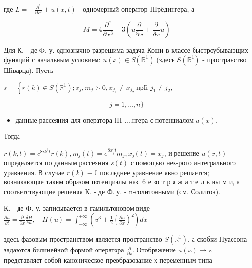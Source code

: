 \documentclass[10pt]{article}
\begin{document}
где $L=-\frac{\partial^{2}}{\partial x^{2}}+u(x, t)$ - одномерный оператор IIIрёдингера, а



\[

M=4 \frac{\partial^{s}}{\partial x^{3}}-3\left(u \frac{\partial}{\partial x}+\frac{\partial}{\partial x} u\right)

\]



Для К. - де Ф. у. однозначно разрешима задача Коши в классе быстроубывающих функций с начальным условием: $u(x) \in S\left(\mathbb{R}^{1}\right)$ (здесь $S\left(\mathbb{R}^{1}\right)$ - пространство Шіварца). Пусть



$s=\left\{r(k) \in S\left(\mathbb{R}^{1}\right) ; x_{j}, m_{j}>0, x_{j_{1}} \neq x_{j_{2}}\right.$ прІі $j_{1} \neq j_{2}$,



\[

j=1, \ldots, n\}

\]



\begin{itemize}

  \item данные рассеяния для оператора III ....нгера с потенциалом $u(x)$.

\end{itemize}



Тогда



$r(k, t)=e^{8 i k^{3} t} r(k), m_{j}(t)=e^{8 x_{j}^{3} t} m_{j}, x_{j}(t)=x_{j}$, и решение $u(x, t)$ определяется по данным рассеяния $s(t)$ с помощью нек-рого интегрального уравнения. В случае $r(k) \equiv 0$ последнее уравнение явно решается; возникающие таким образом потенциалы наз. 6 е зо т р а ж а т е л ь ны м и, а соответствующие решения К. - де Ф. у. - n-солитонными (см. Солитон).



К. - де Ф. у. записывается в гамильтоновом виде $\frac{\partial u}{\partial t}=\frac{\partial}{\partial x} \frac{\delta H}{\delta u}, \quad H(u)=\int_{-\infty}^{+\infty}\left(u^{3}+\frac{1}{2}\left(\frac{\partial u}{\partial x}\right)^{2}\right) d x$



здесь фазовым пространством является пространство $S\left(\mathbb{R}^{1}\right)$, а скобки Пуассона задаются билинейной формой оператора $\frac{\partial}{\partial x}$. Отображение $u(x) \rightarrow s$ представляет собой каноническое преобразование к переменным типа
\end{document}
